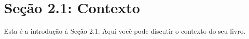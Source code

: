 \section{Seção 2.1: Contexto}
Esta é a introdução à Seção 2.1. Aqui você pode discutir o contexto do seu livro. \cite{exemplochapter2sec1} \cite{artigo2024chapter2sec1}

\printbibliography[heading=subbibliography, title={Referências da Seção 2.1}, keyword=chapter2secao1]